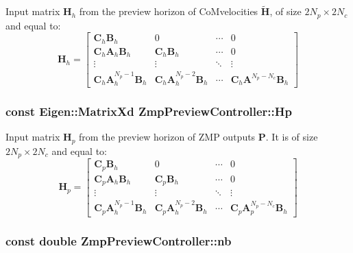 \-Input matrix $\mathbf{H}_h$ from the preview horizon of \-Co\-Mvelocities $\tilde{\mathbf{H}}$, of size $2N_p \times 2N_c$ and equal to\-: \[ \mathbf{H}_h = \left[\begin{array}{cccc} \mathbf{C}_h\mathbf{B}_h & 0 & \cdots & 0 \\ \mathbf{C}_h\mathbf{A}_h\mathbf{B}_h & \mathbf{C}_h\mathbf{B}_h & \cdots & 0 \\ \vdots & \vdots & \ddots & \vdots \\ \mathbf{C}_h\mathbf{A}^{N_p-1}_h\mathbf{B}_h & \mathbf{C}_h\mathbf{A}^{N_p-2}_h\mathbf{B}_h & \cdots & \mathbf{C}_h\mathbf{A}^{N_p - N_c}\mathbf{B}_h \end{array}\right] \] \hypertarget{classZmpPreviewController_a32ab17a3be30490e4a1e874bf3581843}{
\subsubsection[{\-Hp}]{\setlength{\rightskip}{0pt plus 5cm}const \-Eigen\-::\-Matrix\-Xd {\bf \-Zmp\-Preview\-Controller\-::\-Hp}}}\label{classZmpPreviewController_a32ab17a3be30490e4a1e874bf3581843}
\-Input matrix $\mathbf{H}_p$ from the preview horizon of \-Z\-M\-P outputs $\mathbf{P}$. \-It is of size $2N_p \times 2N_c$ and equal to\-: \[ \mathbf{H}_p = \left[\begin{array}{cccc} \mathbf{C}_p\mathbf{B}_h & 0 & \cdots & 0 \\ \mathbf{C}_p\mathbf{A}_h\mathbf{B}_h & \mathbf{C}_p\mathbf{B}_h & \cdots & 0 \\ \vdots & \vdots & \ddots & \vdots \\ \mathbf{C}_p\mathbf{A}^{N_p-1}_h\mathbf{B}_h & \mathbf{C}_p\mathbf{A}^{N_p-2}_h\mathbf{B}_h & \cdots & \mathbf{C}_p\mathbf{A}_p^{N_p - N_c}\mathbf{B}_h \end{array}\right] \] \hypertarget{classZmpPreviewController_a6716ee4c94e6f91e608ee1e29fbc7051}{
\subsubsection[{nb}]{\setlength{\rightskip}{0pt plus 5cm}const double {\bf \-Zmp\-Preview\-Controller\-::nb}}}\label{classZmpPreviewController_a6716ee4c94e6f91e608ee1e29fbc7051}
